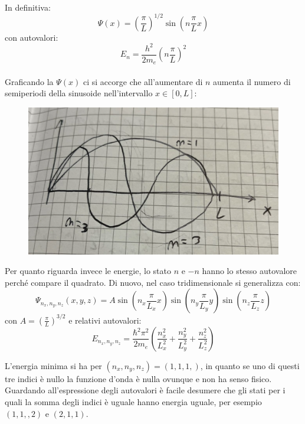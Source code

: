\documentclass{book}
\begin{document}
            \paragraph{}
                In definitiva:
                $$\Psi(x) = (\frac{\pi}{L})^{1/2} \sin(n \frac{\pi}{L} x)$$
                con autovalori:
                $$E_{n} = \frac{h^{2}}{2m_{e}}( n\frac{\pi}{L})^{2}$$

            \newpage
            \paragraph{}
                Graficando la $\Psi(x)$ ci si accorge che all'aumentare di $n$ aumenta il numero di semiperiodi della sinusoide nell'intervallo $x \in [0, L]$:
                \begin{figure}[h!]
                    \centering
                    \includegraphics[width=0.5\linewidth]{img/intervalliSinLez12.png}           
                \end{figure}
                \newline
                Per quanto riguarda invece le energie, lo stato $n$ e $-n$ hanno lo stesso autovalore perché compare il quadrato. \newline
                Di nuovo, nel caso tridimensionale si generalizza con:
                $$\Psi_{n_{x}, n_{y}, n_{z}} (x,y,z) = A\sin(n_{x} \frac{\pi}{L_{x}} x)\sin(n_{y} \frac{\pi}{L_{y}} y)\sin(n_{z} \frac{\pi}{L_{z}} z)$$
                con $A= (\frac{\pi}{L})^{3/2}$
                e relativi autovalori:
                $$E_{n_{x},n_{y},n_{z}} = \frac{\hbar ^{2} \pi ^{2}}{2m_{e}} (\frac{n_{x} ^{2}}{L_{x} ^{2}}+\frac{n_{y} ^{2}}{L_{y} ^{2}}+\frac{n_{z} ^{2}}{L_{z} ^{2}})$$

                L'energia minima si ha per $(n_{x}, n_{y}, n_{z}) = (1,1,1,)$, in quanto se uno di questi tre indici è nullo la funzione d'onda è nulla ovunque e non ha senso fisico. Guardando all'espressione degli autovalori è facile desumere che gli stati per i quali la somma degli indici è uguale hanno energia uguale, per esempio $(1,1,,2)$ e $(2,1,1)$.
\end{document}

